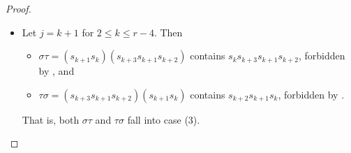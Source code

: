 \documentclass[10pt,a4paper]{amsart}
\begin{document}
\begin{proof}
\begin{itemize}
\begin{itemize}
            \item $\tau\sigma= (s_{k+2}s_{k}s_{k+1})(s_{k+1}s_k)=s_{k+2}\in S$.
        \end{itemize}
        That is, $\sigma\tau$ falls into case (3) and $\tau\sigma$ falls into case (1).
        \item Let $j=k+1$ for $2\leq k\leq r-4$. Then \begin{itemize}
            \item $\sigma\tau=(s_{k+1}s_k)(s_{k+3}s_{k+1}s_{k+2})$ contains $s_ks_{k+3}s_{k+1}s_{k+2}$, forbidden by , and
            \item $\tau\sigma= (s_{k+3}s_{k+1}s_{k+2})(s_{k+1}s_k)$ contains $s_{k+2}s_{k+1}s_k$, forbidden by .
        \end{itemize}
        That is, both $\sigma\tau$ and $\tau\sigma$ fall into case (3).
    \end{itemize}
\smallskip


\end{proof}
\end{document}
